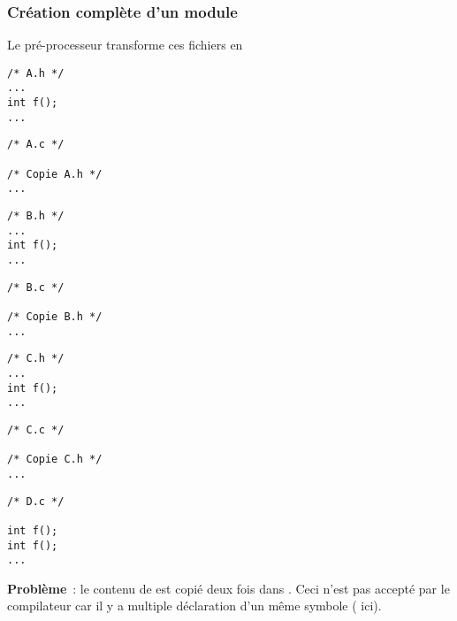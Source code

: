 \begin{frame}[fragile]
\frametitle{Création complète d'un module}
Le pré-processeur transforme ces fichiers en
\bigskip

\begin{minipage}[c]{.22\textwidth}
\begin{lstlisting}[frame=single,numbers=none]
/* A.h */
...
int f();
...
\end{lstlisting}
\end{minipage}
\enspace
\begin{minipage}[c]{.22\textwidth}
\begin{lstlisting}[frame=single,numbers=none]
/* A.c */

/* Copie A.h */
...
\end{lstlisting}
\end{minipage}
\quad
\begin{minipage}[c]{.22\textwidth}
\begin{lstlisting}[frame=single,numbers=none]
/* B.h */
...
int f();
...
\end{lstlisting}
\end{minipage}
\enspace
\begin{minipage}[c]{.22\textwidth}
\begin{lstlisting}[frame=single,numbers=none]
/* B.c */

/* Copie B.h */
...
\end{lstlisting}
\end{minipage}
\medskip

\begin{minipage}[c]{.22\textwidth}
\begin{lstlisting}[frame=single,numbers=none]
/* C.h */
...
int f();
...
\end{lstlisting}
\end{minipage}
\enspace
\begin{minipage}[c]{.22\textwidth}
\begin{lstlisting}[frame=single,numbers=none]
/* C.c */

/* Copie C.h */
...
\end{lstlisting}
\end{minipage}
\qquad \qquad
\begin{minipage}[c]{.22\textwidth}
\begin{lstlisting}[frame=single,numbers=none]
/* D.c */

int f();
int f();
...
\end{lstlisting}
\end{minipage}
\medskip

{\bf Problème}~: le contenu de  est copié deux fois dans
. Ceci n'est pas accepté par le compilateur car il y a
\alert{multiple déclaration} d'un même symbole ( ici).
\end{frame}

